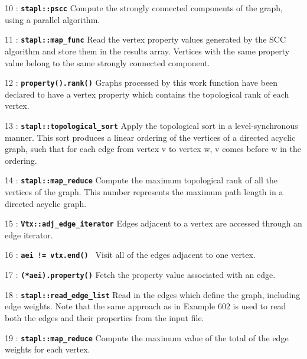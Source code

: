 \documentclass{report}
\begin{document}
\begin{hashitemize}
\item 10 : \texttt{{\bf stapl::pscc}}
\newline
Compute the strongly connected components of the graph, using a parallel
algorithm.

\item 11 : \texttt{{\bf stapl::map\_func}}
\newline
Read the vertex property values generated by the SCC algorithm and store them in
the results array. Vertices with the same property value belong to the same
strongly connected component.

\item 12 : \texttt{{\bf property().rank()}}
\newline
Graphs processed by this work function have been declared to have a
vertex property which contains the topological rank of each vertex.

\item 13 : \texttt{{\bf stapl::topological\_sort}}
\newline
Apply the topological sort in a level-synchronous manner.
This sort produces a linear ordering of the vertices of a directed
acyclic graph, such that for each edge from vertex v to vertex w,
v comes before w in the ordering.

\item 14 : \texttt{{\bf stapl::map\_reduce}}
\newline
Compute the maximum topological rank of all the vertices of the graph. This
number represents the maximum path length in a directed acyclic graph.

\item 15 : \texttt{{\bf Vtx::adj\_edge\_iterator}}
\newline
Edges adjacent to a vertex are accessed through an edge iterator.

\item 16 : \texttt{{\bf aei != vtx.end() }}
\newline
Visit all of the edges adjacent to one vertex.

\item 17 : \texttt{{\bf (*aei).property()}}
\newline
Fetch the property value associated with an edge.

\item 18 : \texttt{{\bf stapl::read\_edge\_list}}
\newline
Read in the edges which define the graph, including edge weights. Note
that the same approach as in Example 602 is used to read both the edges and
their properties from the input file.

\item 19 : \texttt{{\bf stapl::map\_reduce}}
\newline
Compute the maximum value of the total of the edge weights for each vertex.

\end{hashitemize}
\end{document}
